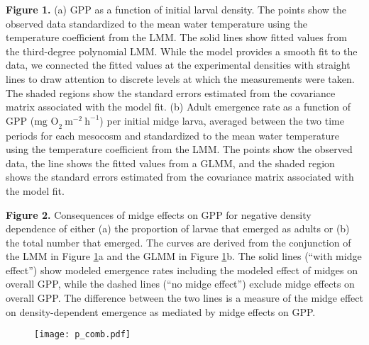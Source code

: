 \documentclass[12pt]{article}
\begin{document}
\textbf{Figure 1.}
(a) GPP as a function of initial larval density.
The points show the observed data standardized to the mean water temperature 
using the temperature coefficient from the LMM.
The solid lines show fitted values from the third-degree polynomial LMM.
While the model provides a smooth fit to the data,
we connected the fitted values at the experimental densities with
straight lines to draw attention to discrete levels at which the measurements were taken. 
The shaded regions show the standard errors estimated from the 
covariance matrix associated with the model fit.
(b) Adult emergence rate as a function of GPP ($\text{mg O}_2~\text{m}^{-2}~\text{h}^{-1}$) 
per initial midge larva, 
averaged between the two time periods for each mesocosm 
and standardized to the mean water temperature 
using the temperature coefficient from the LMM.
The points show the observed data, 
the line shows the fitted values from a GLMM,
and the shaded region shows the standard errors estimated from the 
covariance matrix associated with the model fit.


\textbf{Figure 2.}
Consequences of midge effects on GPP for negative density dependence of 
either (a) the proportion of larvae that emerged as adults or 
(b) the total number that emerged.
The curves are derived from the conjunction of the LMM in Figure \ref{fig:comb}a
and the GLMM in Figure \ref{fig:comb}b. 
The solid lines (``with midge effect'') show modeled emergence rates including the modeled
effect of midges on overall GPP,
while the dashed lines (``no midge effect'') exclude midge effects on overall GPP.
The difference between the two lines is a measure of the midge effect on density-dependent
emergence as mediated by midge effects on GPP. 



\begin{figure}
\centering
\linespread{1}
\texttt{[image: p\_comb.pdf]}
\caption{\label{fig:comb}
}
\end{figure}
\end{document}
